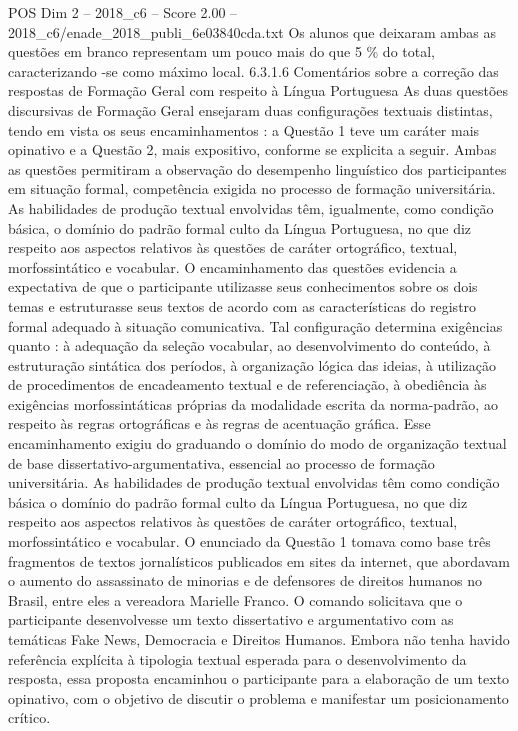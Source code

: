 \begin{textsample}{POS Dim 2 – 2018\_c6 – Score 2.00 – 2018\_c6/enade\_2018\_publi\_6e03840cda.txt}
Os alunos que deixaram ambas as questões em branco representam um pouco mais do que 5 \% do total, caracterizando -se como máximo local. 6.3.1.6 Comentários sobre a correção das respostas de Formação Geral com respeito à Língua Portuguesa As duas questões discursivas de Formação Geral ensejaram duas configurações textuais distintas, tendo em vista os seus encaminhamentos : a Questão 1 teve um caráter mais opinativo e a Questão 2, mais expositivo, conforme se explicita a seguir.
Ambas as questões permitiram a observação do desempenho linguístico dos participantes em situação formal, competência exigida no processo de formação universitária.
As habilidades de produção textual envolvidas têm, igualmente, como condição básica, o domínio do padrão formal culto da Língua Portuguesa, no que diz respeito aos aspectos relativos às questões de caráter ortográfico, textual, morfossintático e vocabular.
O encaminhamento das questões evidencia a expectativa de que o participante utilizasse seus conhecimentos sobre os dois temas e estruturasse seus textos de acordo com as características do registro formal adequado à situação comunicativa.
Tal configuração determina exigências quanto : à adequação da seleção vocabular, ao desenvolvimento do conteúdo, à estruturação sintática dos períodos, à organização lógica das ideias, à utilização de procedimentos de encadeamento textual e de referenciação, à obediência às exigências morfossintáticas próprias da modalidade escrita da norma-padrão, ao respeito às regras ortográficas e às regras de acentuação gráfica.
Esse encaminhamento exigiu do graduando o domínio do modo de organização textual de base dissertativo-argumentativa, essencial ao processo de formação universitária.
As habilidades de produção textual envolvidas têm como condição básica o domínio do padrão formal culto da Língua Portuguesa, no que diz respeito aos aspectos relativos às questões de caráter ortográfico, textual, morfossintático e vocabular.
O enunciado da Questão 1 tomava como base três fragmentos de textos jornalísticos publicados em sites da internet, que abordavam o aumento do assassinato de minorias e de defensores de direitos humanos no Brasil, entre eles a vereadora Marielle Franco.
O comando solicitava que o participante desenvolvesse um texto dissertativo e argumentativo com as temáticas Fake News, Democracia e Direitos Humanos.
Embora não tenha havido referência explícita à tipologia textual esperada para o desenvolvimento da resposta, essa proposta encaminhou o participante para a elaboração de um texto opinativo, com o objetivo de discutir o problema e manifestar um posicionamento crítico.

\end{textsample}
